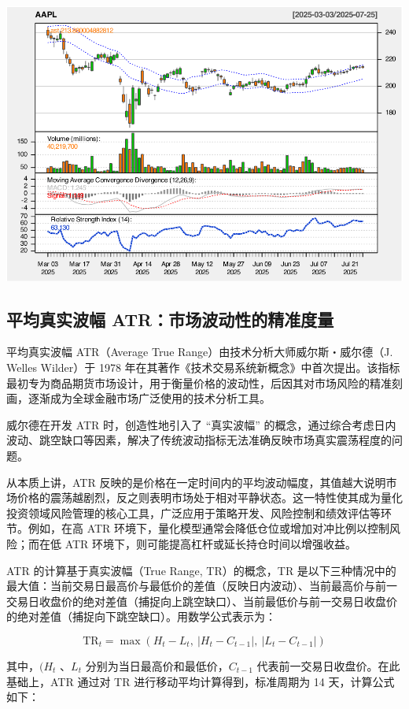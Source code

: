 \documentclass[]{ctexbook}
\begin{document}
\includegraphics[width=0.9\linewidth]{QuantmodHandbook_files/figure-latex/envol_2-4}

\subsection{平均真实波幅 ATR：市场波动性的精准度量}\label{ux5e73ux5747ux771fux5b9eux6ce2ux5e45-atrux5e02ux573aux6ce2ux52a8ux6027ux7684ux7cbeux51c6ux5ea6ux91cf}

平均真实波幅 ATR（Average True Range）由技术分析大师威尔斯・威尔德（J. Welles Wilder）于 1978 年在其著作《技术交易系统新概念》中首次提出。该指标最初专为商品期货市场设计，用于衡量价格的波动性，后因其对市场风险的精准刻画，逐渐成为全球金融市场广泛使用的技术分析工具。

威尔德在开发 ATR 时，创造性地引入了 ``真实波幅'' 的概念，通过综合考虑日内波动、跳空缺口等因素，解决了传统波动指标无法准确反映市场真实震荡程度的问题。

从本质上讲，ATR 反映的是价格在一定时间内的平均波动幅度，其值越大说明市场价格的震荡越剧烈，反之则表明市场处于相对平静状态。这一特性使其成为量化投资领域风险管理的核心工具，广泛应用于策略开发、风险控制和绩效评估等环节。例如，在高 ATR 环境下，量化模型通常会降低仓位或增加对冲比例以控制风险；而在低 ATR 环境下，则可能提高杠杆或延长持仓时间以增强收益。

ATR 的计算基于真实波幅（True Range, TR）的概念，TR 是以下三种情况中的最大值：当前交易日最高价与最低价的差值（反映日内波动）、当前最高价与前一交易日收盘价的绝对差值（捕捉向上跳空缺口）、当前最低价与前一交易日收盘价的绝对差值（捕捉向下跳空缺口）。用数学公式表示为：

\[
\text{TR}_t = \max\left(H_t - L_t, \ |H_t - C_{t-1}|, \ |L_t - C_{t-1}| \right)
\]

其中，\((H_t\) 、\(L_t\) 分别为当日最高价和最低价，\(C_{t-1}\) 代表前一交易日收盘价。在此基础上，ATR 通过对 TR 进行移动平均计算得到，标准周期为 14 天，计算公式如下：
\end{document}
